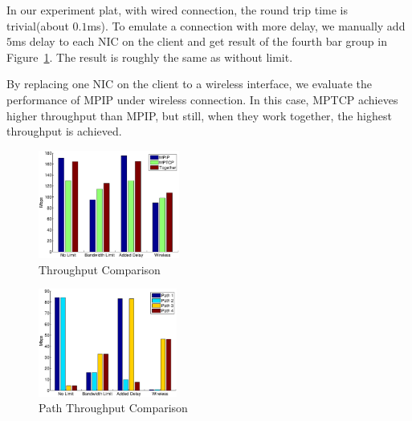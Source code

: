 In our experiment plat, with wired connection, the round trip time is trivial(about $0.1$ms). To emulate a connection with more delay, we manually add $5$ms delay to each NIC on the client and get result of the fourth bar group in Figure~\ref{fig.tp_bar}. The result is roughly the same as without limit.

By replacing one NIC on the client to a wireless interface, we evaluate the performance of MPIP under wireless connection. In this case, MPTCP achieves higher throughput than MPIP, but still, when they work together, the highest throughput is achieved.

\begin{figure}
\centering
\includegraphics[width=0.8\linewidth,height=1.4in]{fig/tp_bar.eps}
\caption{Throughput Comparison}
\label{fig.tp_bar}
\end{figure}

\begin{figure}
\centering
\includegraphics[width=0.8\linewidth,height=1.4in]{fig/path_tp_bar.eps}
\caption{Path Throughput Comparison}
\label{fig.path_tp_bar}
\end{figure}




